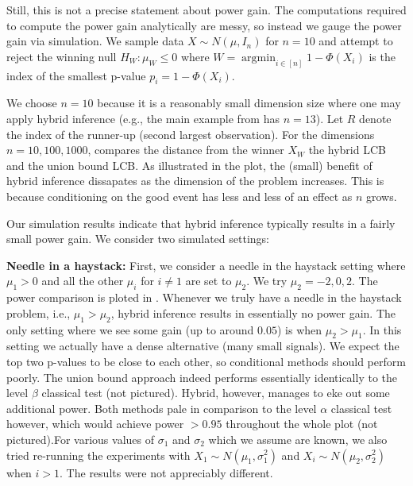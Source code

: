 \documentclass{article}
\DeclareMathOperator*{\argmin}{argmin}
\begin{document}
\begin{appendix}
Still, this is not a precise statement about power gain. The computations required to compute the power gain analytically are messy, so instead we gauge the power gain via simulation. We sample data $X \sim N(\mu, I_n)$ for $n=10$ and attempt to reject the winning null $H_W: \mu_W \leq 0$ where $W = \argmin_{i \in [n]} 1 - \Phi(X_i)$ is the index of the smallest p-value $p_i = 1-\Phi(X_i)$.  

We choose $n=10$ because it is a reasonably small dimension size where one may apply hybrid inference (e.g., the main example from \cite{Andrews2023} has $n=13$). Let $R$ denote the index of the runner-up (second largest observation). For the dimensions  $n=10, 100, 1000$,  
compares the distance from the winner $X_W$ the hybrid LCB and the union bound LCB. As illustrated in the plot, the (small) benefit of hybrid inference dissapates as the dimension of the problem increases. This is because conditioning on the good event has less and less of an effect as $n$ grows. 

Our simulation results indicate that hybrid inference typically results in a fairly small power gain. We consider two simulated settings: \newline 

\noindent \textbf{Needle in a haystack: } First, we consider a needle in the haystack setting where $\mu_1 > 0$ and all the other $\mu_i$ for $ i\neq 1$ are set to $\mu_2$. We try $\mu_2 = -2, 0, 2$. The power comparison is ploted in . Whenever we truly have a needle in the haystack problem, i.e., $\mu_1 > \mu_2$, hybrid inference results in essentially no power gain. The only setting where we see some gain (up to around $0.05$) is when $\mu_2 > \mu_1$. In this setting  we actually have a dense alternative (many small signals). We expect the top two p-values to be close to each other, so conditional methods should perform poorly. The union bound approach indeed performs essentially identically to the level $\beta$ classical test (not pictured). Hybrid, however, manages to eke out some additional power. Both methods pale in comparison to the level $\alpha$ classical test however, which would achieve power $>0.95$ throughout the whole plot (not pictured).For various values of $\sigma_1$ and $\sigma_2$ which we assume are known, we also tried re-running the experiments with  $X_1 \sim N(\mu_1, \sigma_1^2)$ and $X_i \sim N(\mu_2, \sigma_2^2)$ when $i > 1$. The results were not appreciably different.  \newline 


\end{appendix}
\end{document}
